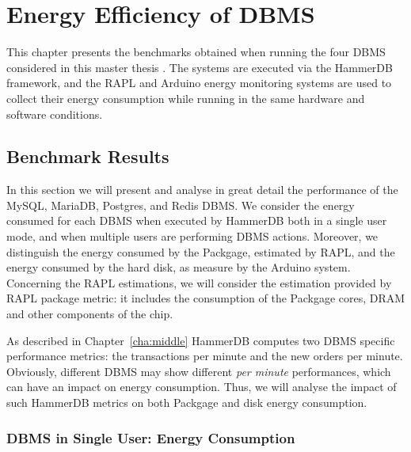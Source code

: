 \chapter{Energy Efficiency of DBMS}
\label{cha:Results}


This chapter presents the benchmarks obtained when running the four DBMS considered in this master thesis . The systems are executed via the HammerDB framework, and the RAPL and Arduino energy monitoring systems are used to collect their energy consumption while running in the same hardware and software conditions.
\section{Benchmark Results}

In this section we will present and analyse in great detail the performance of the MySQL, MariaDB, Postgres, and Redis DBMS.  We consider the energy consumed for each DBMS when executed by HammerDB both in a single user mode, and when multiple users are performing DBMS actions. Moreover, we distinguish the energy consumed by the Packgage, estimated by RAPL, and the energy consumed by the hard disk, as measure by the Arduino system. Concerning the RAPL estimations, we will consider the estimation provided by RAPL package metric: it includes the consumption of the Packgage cores, DRAM and other components of the chip.  

As described in Chapter~\ref{cha:middle} HammerDB computes two DBMS specific performance metrics: the transactions per minute and the new orders per minute. Obviously, different DBMS may show different \textit{per minute} performances, which can have an impact on energy consumption. Thus, we will analyse  the impact of such HammerDB metrics on both Packgage and disk energy consumption. 



\subsection{DBMS in Single User: Energy Consumption}



